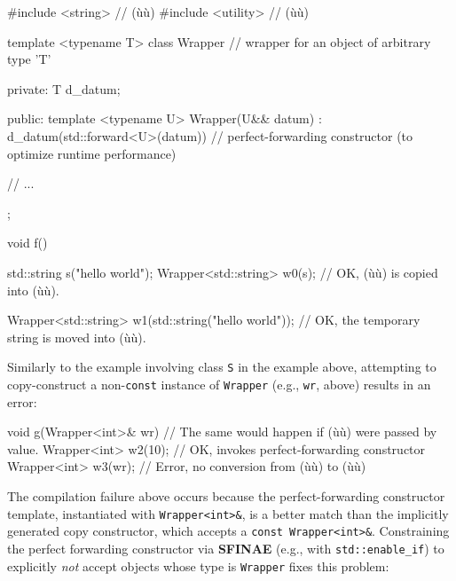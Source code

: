 \begin{emcppshiddenlisting}[emcppsbatch=e18]
#include <string>   // (ù{}ù)
#include <utility>  // (ù{}ù)
\end{emcppshiddenlisting}
\begin{emcppslisting}[emcppsbatch=e18]
template <typename T>
class Wrapper  // wrapper for an object of arbitrary type 'T'
{
private:
    T d_datum;

public:
    template <typename U>
    Wrapper(U&& datum) : d_datum(std::forward<U>(datum)) { }
        // perfect-forwarding constructor (to optimize runtime performance)

    // ...
};

void f()
{
    std::string s("hello world");
    Wrapper<std::string> w0(s);  // OK, (ù{}ù) is copied into (ù{}ù).

    Wrapper<std::string> w1(std::string("hello world"));
        // OK, the temporary string is moved into (ù{}ù).
}
\end{emcppslisting}

\noindent Similarly to the example involving class \texttt{S} in the example above, attempting
to copy-construct a non-\texttt{const} instance of \texttt{Wrapper}
(e.g., \texttt{wr}, above) results in an error:

\begin{emcppslisting}[emcppsbatch=e18]
void g(Wrapper<int>& wr)  // The same would happen if (ù{}ù) were passed by value.
{
    Wrapper<int> w2(10);  // OK, invokes perfect-forwarding constructor
    Wrapper<int> w3(wr);  // Error, no conversion from (ù{}ù) to (ù{}ù)
}
\end{emcppslisting}

\noindent The compilation failure above occurs because the perfect-forwarding
constructor template, instantiated with \texttt{Wrapper<int>\&}, is a
better match than the implicitly generated copy constructor, which
accepts a \texttt{const}~\texttt{Wrapper<int>\&}. Constraining the
perfect forwarding constructor via \textbf{SFINAE} (e.g., with
\texttt{std::enable\_if}) to explicitly \emph{not} accept objects whose
type is \texttt{Wrapper} fixes this problem:

